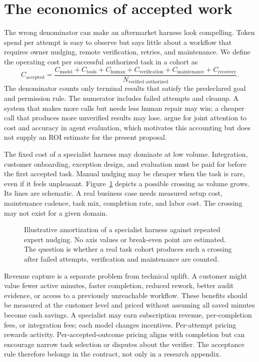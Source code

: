 \section{The economics of accepted work}

The wrong denominator can make an aftermarket harness look compelling. Token spend per attempt is easy to observe but says little about a workflow that requires owner nudging, remote verification, retries, and maintenance. We define the operating cost per successful authorized task in a cohort as
\[
C_{\mathrm{accepted}}=\frac{C_{\mathrm{model}}+C_{\mathrm{tools}}+C_{\mathrm{human}}+C_{\mathrm{verification}}+C_{\mathrm{maintenance}}+C_{\mathrm{recovery}}}{N_{\mathrm{verified\;authorized}}}.
\]
The denominator counts only terminal results that satisfy the predeclared goal and permission rule. The numerator includes failed attempts and cleanup. A system that makes more calls but needs less human repair may win; a cheaper call that produces more unverified results may lose. \citet{agentsmatter} argue for joint attention to cost and accuracy in agent evaluation, which motivates this accounting but does not supply an ROI estimate for the present proposal.

The fixed cost of a specialist harness may dominate at low volume. Integration, customer onboarding, exception design, and evaluation must be paid for before the first accepted task. Manual nudging may be cheaper when the task is rare, even if it feels unpleasant. Figure~\ref{fig:amortization} depicts a possible crossing as volume grows. Its lines are schematic. A real business case needs measured setup cost, maintenance cadence, task mix, completion rate, and labor cost. The crossing may not exist for a given domain.

\begin{figure}[tbp]
\centering
\caption{Illustrative amortization of a specialist harness against repeated expert nudging. No axis values or break-even point are estimated. The question is whether a real task cohort produces such a crossing after failed attempts, verification and maintenance are counted.}
\label{fig:amortization}
\end{figure}

Revenue capture is a separate problem from technical uplift. A customer might value fewer active minutes, faster completion, reduced rework, better audit evidence, or access to a previously unreachable workflow. These benefits should be measured at the customer level and priced without assuming all saved minutes become cash savings. A specialist may earn subscription revenue, per-completion fees, or integration fees; each model changes incentives. Per-attempt pricing rewards activity. Per-accepted-outcome pricing aligns with completion but can encourage narrow task selection or disputes about the verifier. The acceptance rule therefore belongs in the contract, not only in a research appendix.

